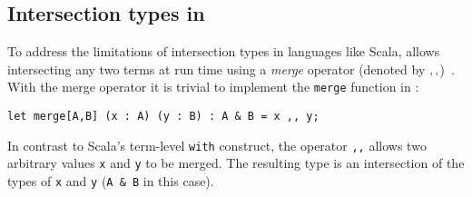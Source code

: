 \subsection{Intersection types in \name}


To address the limitations of intersection types in languages like
Scala, \name allows intersecting any two terms at run time using a
\emph{merge} operator (denoted by $ ,, $)~\cite{dunfield2014elaborating}.  With the merge
operator it is trivial to implement the \lstinline{merge} function in \name:

\begin{lstlisting}
let merge[A,B] (x : A) (y : B) : A & B = x ,, y;
\end{lstlisting}

\noindent In contrast to Scala's term-level \lstinline{with}
construct, the operator \lstinline{,,} allows two arbitrary values \lstinline{x}
and \lstinline{y} to be merged. The resulting type is an
intersection of the types of  \lstinline{x}
and \lstinline{y} (\lstinline{A & B} in this case).

\begin{comment}
The following table
summarizes the extent of support for intersection types in Java,
Scala, and \name.

\hspace{-13pt}\begin{tabular}{ l | c | c | c  }
                                   & Java       & Scala      & \name      \\ \hline
  Basic intersection types         & \checkmark & \checkmark & \checkmark \\ \hline
  Anonymous intersection types     &            & \checkmark & \checkmark \\ \hline
  Intersection of type parameters  &            & \checkmark & \checkmark \\ \hline
  Term-level intersection          &            &            & \checkmark
\end{tabular} \\
\end{comment}

